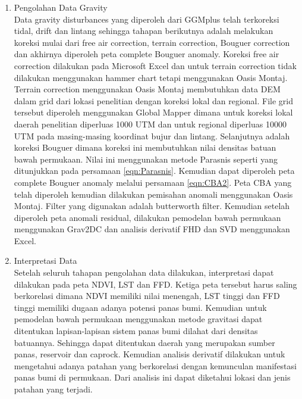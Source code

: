 \begin{enumerate}
	\vskip 5pt
	\item Pengolahan Data Gravity \\
	Data gravity disturbances yang diperoleh dari GGMplus telah terkoreksi tidal, drift dan lintang sehingga tahapan berikutnya adalah melakukan koreksi mulai dari free air correction, terrain correction, Bouguer correction dan akhirnya diperoleh peta complete Bouguer anomaly. Koreksi free air correction dilakukan pada Microsoft Excel dan untuk terrain correction tidak dilakukan menggunakan hammer chart tetapi menggunakan Oasis Montaj. Terrain correction menggunakan Oasis Montaj membutuhkan data DEM dalam grid dari lokasi penelitian dengan koreksi lokal dan regional. File grid tersebut diperoleh menggunakan Global Mapper dimana untuk koreksi lokal daerah penelitian diperluas 1000 UTM dan untuk regional diperluas 10000 UTM pada masing-masing koordinat bujur dan lintang. Selanjutnya adalah koreksi Bouguer dimana koreksi ini membutuhkan nilai densitas batuan bawah permukaan. Nilai ini menggunakan metode Parasnis seperti yang ditunjukkan pada persamaan \ref{eqn:Parasnis}. Kemudian dapat diperoleh peta complete Bouguer anomaly melalui persamaan \ref{eqn:CBA2}.  Peta CBA yang telah diperoleh kemudian dilakukan pemisahan anomali menggunakan Oasis Montaj. Filter yang digunakan adalah butterworth filter. Kemudian setelah diperoleh peta anomali residual, dilakukan pemodelan bawah permukaan menggunakan Grav2DC dan analisis derivatif FHD dan SVD menggunakan Excel.
	\vskip 5pt
	\item Interpretasi Data\\
	Setelah seluruh tahapan pengolahan data dilakukan, interpretasi dapat dilakukan pada peta NDVI, LST dan FFD. Ketiga peta tersebut harus saling berkorelasi dimana NDVI memiliki nilai menengah, LST tinggi dan FFD tinggi memiliki dugaan adanya potensi panas bumi. Kemudian untuk pemodelan bawah permukaan menggunakan metode gravitasi dapat ditentukan lapisan-lapisan sistem panas bumi dilahat dari densitas batuannya. Sehingga dapat ditentukan daerah yang merupakan sumber panas, reservoir dan caprock. Kemudian analisis derivatif dilakukan untuk mengetahui adanya patahan yang berkorelasi dengan kemunculan manifestasi panas bumi di permukaan. Dari analisis ini dapat diketahui lokasi dan jenis patahan yang terjadi.

\end{enumerate}